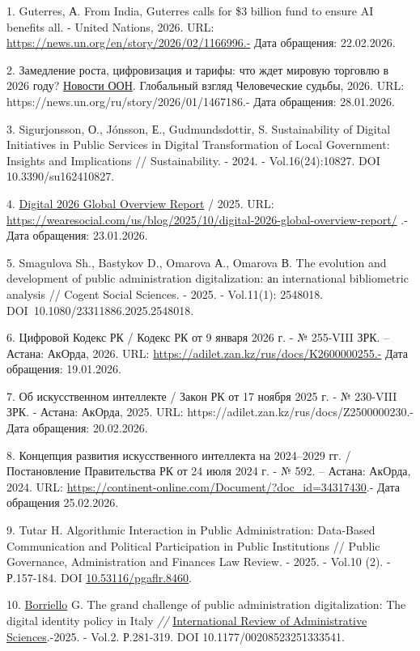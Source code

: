 \begin{refs}
1. Guterres, А. From India, Guterres calls for \$3 billion fund to ensure
AI benefits all. - United Nations, 2026. URL:
\url{https://news.un.org/en/story/2026/02/1166996.-} Дата обращения:
22.02.2026.

2. Замедление роста, цифровизация и тарифы: что ждет мировую торговлю в
2026 году? \href{https://news.un.org/ru/}{Новости ООН}. Глобальный
взгляд Человеческие судьбы, 2026. URL:
https://news.un.org/ru/story/2026/01/1467186.- Дата обращения:
28.01.2026.

3. Sigurjonsson, О., Jónsson, Е., Gudmundsdottir, S. Sustainability of
Digital Initiatives in Public Services in Digital Transformation of
Local Government: Insights and Implications // Sustainability. - 2024.
- Vol.16(24):10827. DOI 10.3390/su162410827.

4. \href{https://datareportal.com/reports/digital-2026-global-overview-report}{Digital
2026 Global Overview Report} / 2025. URL:
\url{https://wearesocial.com/us/blog/2025/10/digital-2026-global-overview-report/}
.-Дата обращения: 23.01.2026.

5. Smagulova Sh., Bastykov D., Omarova А., Omarova В. The evolution and
development of public administration digitalization: аn international
bibliometric analysis // Cogent Social Sciences. - 2025. - Vol.11(1):
2548018. DOI~10.1080/23311886.2025.2548018.

6. Цифровой Кодекс РК / Кодекс РК от 9 января 2026 г. - № 255-VIII ЗРК.
-- Астана: АкОрда, 2026. URL:
\url{https://adilet.zan.kz/rus/docs/K2600000255.-} Дата обращения:
19.01.2026.

7. Об искусственном интеллекте / Закон РК от 17 ноября 2025 г. - №
230-VIII ЗРК. - Астана: АкОрда, 2025. URL:
https://adilet.zan.kz/rus/docs/Z2500000230.- Дата обращения:
20.02.2026.

8. Концепция развития искусственного интеллекта на 2024--2029 гг. /
Постановление Правительства РК от 24 июля 2024 г. - № 592. -- Астана:
АкОрда, 2024. URL:
\url{https://continent-online.com/Document/?doc_id=34317430}.- Дата
обращения 25.02.2026.

9. Tutar H. Algorithmic Interaction in Public Administration: Data-Based
Communication and Political Participation in Public Institutions //
Public Governance, Administration and Finances Law Review. - 2025. -
Vol.10 (2). - Р.157-184. DOI
\href{https://doi.org/10.53116/pgaflr.8460}{10.53116/pgaflr.8460}.

10. \href{https://journals.sagepub.com/doi/10.1177/00208523251333541\#con}{Borriello}
G. The grand challenge of public administration digitalization: The
digital identity policy in Italy \emph{//}
\href{https://journals.sagepub.com/home/RAS}{International Review of
Administrative Sciences}.-2025. - Vol.2. Р.281-319. DOI
10.1177/00208523251333541.


\end{refs}

